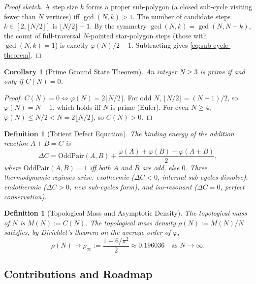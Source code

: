 \documentclass[11pt,a4paper]{article}
\newtheorem{corollary}[theorem]{Corollary}
\newtheorem{definition}[theorem]{Definition}
\begin{document}
\begin{proof}[Proof sketch]
A step size $k$ forms a proper sub-polygon (a closed sub-cycle visiting
fewer than $N$ vertices) iff $\gcd(N, k) > 1$. The number of candidate
steps $k \in [2, \lfloor N/2 \rfloor]$ is $\lfloor N/2 \rfloor - 1$. By
the symmetry $\gcd(N, k) = \gcd(N, N-k)$, the count of full-traversal
$N$-pointed star-polygon steps (those with $\gcd(N, k) = 1$) is exactly
$\varphi(N)/2 - 1$. Subtracting gives \eqref{eq:sub-cycle-theorem}.
\end{proof}

\begin{corollary}[Prime Ground State Theorem]
An integer $N \geq 3$ is prime if and only if $C(N) = 0$.
\end{corollary}

\begin{proof}
$C(N) = 0 \iff \varphi(N) = 2\lfloor N/2 \rfloor$. For odd $N$,
$\lfloor N/2 \rfloor = (N-1)/2$, so $\varphi(N) = N - 1$, which holds
iff $N$ is prime (Euler). For even $N \geq 4$, $\varphi(N) \leq N/2 <
N = 2\lfloor N/2 \rfloor$, so $C(N) > 0$.
\end{proof}

\begin{definition}[Totient Defect Equation]
The binding energy of the addition reaction $A + B = C$ is
\begin{equation}
\Delta C = \mathrm{OddPair}(A, B) + \frac{\varphi(A) + \varphi(B) -
\varphi(A+B)}{2},
\label{eq:totient-defect}
\end{equation}
where $\mathrm{OddPair}(A, B) = 1$ iff both $A$ and $B$ are odd, else
$0$. Three thermodynamic regimes arise: \emph{exothermic} ($\Delta C <
0$, internal sub-cycles dissolve), \emph{endothermic} ($\Delta C > 0$,
new sub-cycles form), and \emph{iso-resonant} ($\Delta C = 0$, perfect
conservation).
\end{definition}

\begin{definition}[Topological Mass and Asymptotic Density]
The \emph{topological mass} of $N$ is $M(N) := C(N)$. The
\emph{topological mass density} $\rho(N) := M(N)/N$ satisfies, by
Dirichlet's theorem on the average order of $\varphi$,
\begin{equation}
\rho(N) \to \rho_\infty := \frac{1 - 6/\pi^2}{2} \approx 0.196036
\quad \text{as } N \to \infty.
\label{eq:asymptotic-density}
\end{equation}
\end{definition}

\subsection{Contributions and Roadmap}
\end{document}

